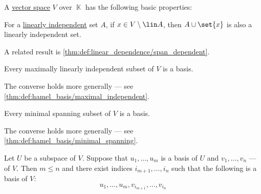 \begin{proposition}\label{thm:def:vector_space}
  A \hyperref[def:vector_space]{vector space} \( V \) over \( \BbbK \) has the following basic properties:
  \begin{thmenum}
     For a \hyperref[def:linear_dependence]{linearly independent} set \( A \), if \( x \in V \setminus \lin A \), then \( A \cup \set{ x } \) is also a linearly independent set.

    A related result is \cref{thm:def:linear_dependence/span_dependent}.

     Every maximally linearly independent subset of \( V \) is a basis.

    The converse holds more generally --- see \cref{thm:def:hamel_basis/maximal_independent}.

     Every minimal spanning subset of \( V \) is a basis.

    The converse holds more generally --- see \cref{thm:def:hamel_basis/minimal_spanning}.

     Let \( U \) be a subspace of \( V \). Suppose that \( u_1, \ldots, u_m \) is a basis of \( U \) and \( v_1, \ldots, v_n \) --- of \( V \). Then \( m \leq n \) and there exist indices \( i_{m+1}, \ldots, i_n \) such that the following is a basis of \( V \):
    \begin{equation*}
      u_1, \ldots, u_m, v_{i_{m+1}}, \ldots, v_{i_n}
    \end{equation*}
  \end{thmenum}
\end{proposition}
